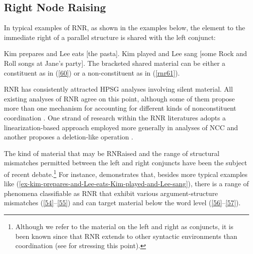 \documentclass[output=paper
	        ,collection
	        ,collectionchapter
 	        ,biblatex
                ,babelshorthands
                ,newtxmath
                ,draftmode
                ,colorlinks, citecolor=brown
]{langscibook}
\begin{document}
{\subsection{Right Node Raising}

In typical examples of RNR, as shown in the examples below, the element to the immediate right of a parallel structure is shared with the left conjunct:

\eal
\label{ex-kim-prepares-and-Lee-eats-Kim-played-and-Lee-sang}
\ex  Kim prepares and Lee eats [the pasta].  \label{60} 
\ex  Kim played and Lee sang [some Rock and Roll songs at Jane's party]. \label{rnr61}
\zl
%
The bracketed shared material can be either a constituent as in (\ref{60}) or a non-constituent as in (\ref{rnr61}).

RNR has consistently attracted HPSG analyses involving silent material.
All existing analyses of RNR \citep{Abeille2016, Beavers2004, Chaves2008-in-lexicon, Chaves2014, Crysmann2003, Shiraishi2019, Yatabe2001, Yatabe2012} agree on this point,
although some of them propose more than one mechanism for accounting for different kinds of nonconstituent coordination \citep{Chaves2014, Yatabe2001, Yatabe2012, Yatabe2019}. One strand of research within the RNR literatures adopts a linearization-based approach employed more generally in analyses of NCC \citep{Yatabe2001, Yatabe2012} and another proposes a deletion-like operation \citep{Abeille2016, Chaves2014, Shiraishi2019}.

%

The kind of material that may be RNRaised and the range of structural mismatches permitted between the left and right conjuncts have been the subject of recent debate.\footnote{Although we refer to the material on the left and right as conjuncts, it is been known since \citet{Hudson1976, Hudson1989} that RNR extends to other syntactic environments than coordination (see \citealt{Chaves2014} for stressing this point).} For instance, \citet[839--840]{Chaves2014} demonstrates that, besides more typical examples like (\ref{ex-kim-prepares-and-Lee-eats-Kim-played-and-Lee-sang}),
 there is a range of phenomena classifiable as RNR that exhibit various argument-structure mismatches (\ref{54}--\ref{55}) and can target material below the word level (\ref{56}--\ref{57}).
%

}
\end{document}

